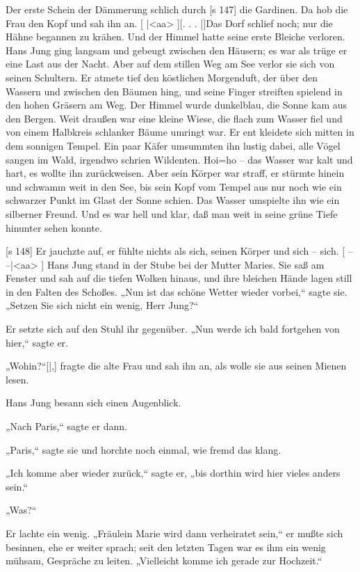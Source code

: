 Der erste Schein der Dämmerung schlich durch
[s 147]
die Gardinen. Da hob die Frau den Kopf und
sah ihn an.
[
|<aa>
][. . . |]Das Dorf schlief noch; nur die Hähne
begannen zu krähen. Und der Himmel hatte seine
erste Bleiche verloren. Hans Jung ging langsam und
gebeugt zwischen den Häusern; es war als trüge er
eine Last aus der Nacht. Aber auf dem stillen Weg
am See verlor sie sich von seinen Schultern. Er
atmete tief den köstlichen Morgenduft, der über den
Wassern und zwischen den Bäumen hing, und seine
Finger streiften spielend in den hohen Gräsern am
Weg. Der Himmel wurde dunkelblau, die Sonne
kam aus den Bergen. Weit draußen war eine kleine
Wiese, die flach zum Wasser fiel und von einem
Halbkreis schlanker Bäume umringt war. Er ent­
kleidete sich mitten in dem sonnigen Tempel. Ein
paar Käfer umsummten ihn lustig dabei, alle Vögel
sangen im Wald, irgendwo schrien Wildenten. Hoi=ho
– das Wasser war kalt und hart, es wollte ihn
zurückweisen. Aber sein Körper war straff, er stürmte
hinein und schwamm weit in den See, bis sein Kopf
vom Tempel aus nur noch wie ein schwarzer Punkt
im Glast der Sonne schien. Das Wasser umspielte
ihn wie ein silberner Freund. Und es war hell und
klar, daß man weit in seine grüne Tiefe hinunter­
sehen konnte.

[s 148]
Er jauchzte auf, er fühlte nichts als sich, seinen
Körper und sich – sich.
[
– –|<aa>
] Hans Jung stand in der Stube bei der
Mutter Maries. Sie saß am Fenster und sah auf die
tiefen Wolken hinaus, und ihre bleichen Hände lagen
still in den Falten des Schoßes. „Nun ist das schöne
Wetter wieder vorbei,“ sagte sie. „Setzen Sie sich
nicht ein wenig, Herr Jung?“

Er setzte sich auf den Stuhl ihr gegenüber.
„Nun werde ich bald fortgehen von hier,“ sagte er.

„Wohin?“[|,] fragte die alte Frau und sah ihn an,
als wolle sie aus seinen Mienen lesen.

Hans Jung besann sich einen Augenblick.

„Nach Paris,“ sagte er dann.

„Paris,“ sagte sie und horchte noch einmal, wie
fremd das klang.

„Ich komme aber wieder zurück,“ sagte er, „bis
dorthin wird hier vieles anders sein.“

„Was?“

Er lachte ein wenig. „Fräulein Marie wird dann
verheiratet sein,“ er mußte sich besinnen, ehe er weiter
sprach; seit den letzten Tagen war es ihm ein wenig
mühsam, Gespräche zu leiten. „Vielleicht komme
ich gerade zur Hochzeit.“

